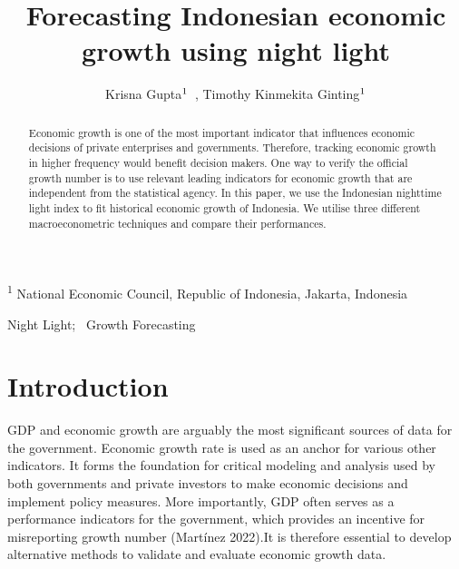 \documentclass[
]{interact}
\title{Forecasting Indonesian economic growth using night light}
\author{Krisna
Gupta$\textsuperscript{1}$~\orcidlink{0000-0001-8695-0514}, Timothy
Kinmekita Ginting$\textsuperscript{1}$}
\begin{document}
\captionsetup{labelsep=space}
\maketitle
\textsuperscript{1}  National Economic Council, Republic of
Indonesia, Jakarta, Indonesia
\begin{abstract}
Economic growth is one of the most important indicator that influences
economic decisions of private enterprises and governments. Therefore,
tracking economic growth in higher frequency would benefit decision
makers. One way to verify the official growth number is to use relevant
leading indicators for economic growth that are independent from the
statistical agency. In this paper, we use the Indonesian nighttime light
index to fit historical economic growth of Indonesia. We utilise three
different macroeconometric techniques and compare their performances.
\end{abstract}
\begin{keywords}
\def\sep{;\ }
Night Light\sep 
Growth Forecasting
\end{keywords}


\section{Introduction}\label{introduction}

GDP and economic growth are arguably the most significant sources of
data for the government. Economic growth rate is used as an anchor for
various other indicators. It forms the foundation for critical modeling
and analysis used by both governments and private investors to make
economic decisions and implement policy measures. More importantly, GDP
often serves as a performance indicators for the government, which
provides an incentive for misreporting growth number (Martínez 2022).It
is therefore essential to develop alternative methods to validate and
evaluate economic growth data.
\end{document}

